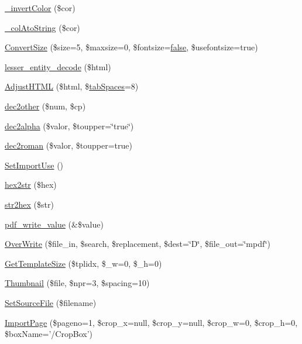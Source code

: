 \begin{DoxyCompactItemize}
\item 
\hyperlink{classm_p_d_f_af6ccd46ef274d33aed364303ae007b71}{\-\_\-invert\-Color} (\$cor)
\item 
\hyperlink{classm_p_d_f_ac4f9b2f3f162ff24c30e53df68ef9ee9}{\-\_\-col\-Ato\-String} (\$cor)
\item 
\hyperlink{classm_p_d_f_aa86bb98ab7d865b299d1764ab43c18e9}{Convert\-Size} (\$size=5, \$maxsize=0, \$fontsize=\hyperlink{ttfontsuni_8php_afbaa04e5cc97693dc668b3c45d3dd740}{false}, \$usefontsize=true)
\item 
\hyperlink{classm_p_d_f_ac47b2c406f7678e7989e1fc014d2c807}{lesser\-\_\-entity\-\_\-decode} (\$html)
\item 
\hyperlink{classm_p_d_f_a10cbdd45ac3b69d3d4d4cfe38794e691}{Adjust\-H\-T\-M\-L} (\$html, \$\hyperlink{show__code_8php_ab4e4c4f5a4a02d8b15368b16f6a0d60c}{tab\-Spaces}=8)
\item 
\hyperlink{classm_p_d_f_adbb2257364e1de539f9098f629bee5b5}{dec2other} (\$num, \$cp)
\item 
\hyperlink{classm_p_d_f_a3412466f739acb57b9545c83624c4906}{dec2alpha} (\$valor, \$toupper=\char`\"{}true\char`\"{})
\item 
\hyperlink{classm_p_d_f_a74d18da6e056771c50056e0428f84635}{dec2roman} (\$valor, \$toupper=true)
\item 
\hyperlink{classm_p_d_f_a0e1762efd6ab72702909769e973840a8}{Set\-Import\-Use} ()
\item 
\hyperlink{classm_p_d_f_a30a9ea49fd09415a89986716b6b65dfd}{hex2str} (\$hex)
\item 
\hyperlink{classm_p_d_f_adb39b6a49adae045a6ee3c2915a7005b}{str2hex} (\$str)
\item 
\hyperlink{classm_p_d_f_a118f8f8d6fe0772a7f9e7791e5da3d36}{pdf\-\_\-write\-\_\-value} (\&\$value)
\item 
\hyperlink{classm_p_d_f_a59394fc53ba2f29d2e510f08f243d72d}{Over\-Write} (\$file\-\_\-in, \$search, \$replacement, \$dest=\char`\"{}D\char`\"{}, \$file\-\_\-out=\char`\"{}mpdf\char`\"{})
\item 
\hyperlink{classm_p_d_f_a32cc6bc48e6edc75d406b36328ca177f}{Get\-Template\-Size} (\$tplidx, \$\-\_\-w=0, \$\-\_\-h=0)
\item 
\hyperlink{classm_p_d_f_a70f4d956236e319531a4a560287f78c8}{Thumbnail} (\$file, \$npr=3, \$spacing=10)
\item 
\hyperlink{classm_p_d_f_aabded4ad699057d16a6683adacfed833}{Set\-Source\-File} (\$filename)
\item 
\hyperlink{classm_p_d_f_a76b08baa17ffab5b6d56b7f3dbb56fe4}{Import\-Page} (\$pageno=1, \$crop\-\_\-x=null, \$crop\-\_\-y=null, \$crop\-\_\-w=0, \$crop\-\_\-h=0, \$box\-Name='/Crop\-Box')

\end{DoxyCompactItemize}
